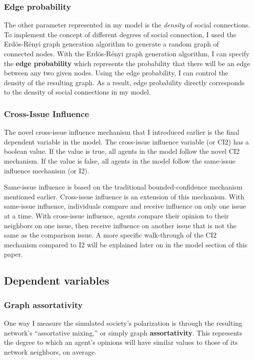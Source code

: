 \subsubsection{Edge probability}

The other parameter represented in my model is the \textit{density} of social
connections. To implement the concept of different degrees of social
connection, I used the Erd\"{o}s-R\'{e}nyi graph generation algorithm to
generate a random graph of connected nodes. With the Erd\"{o}s-R\'{e}nyi graph
generation algorithm, I can specify the \textbf{edge probability} which represents the
probability that there will be an edge between any two given nodes. Using the
edge probability, I can control the density of the resulting graph. As a
result, edge probability directly corresponds to the density of social
connections in my model.    

\subsubsection{Cross-Issue Influence}
The novel cross-issue influence mechanism that I introduced earlier is the final dependent variable in the model. The cross-issue influence variable (or CI2) has a boolean value. If the value is true, all agents in the model follow the novel CI2 mechanism. If the value is false, all agents in the model follow the same-issue influence mechanism (or I2).

Same-issue influence is based on the traditional bounded-confidence mechanism mentioned earlier. Cross-issue influence is an extension of this mechanism. With same-issue influence, individuals compare and receive influence on only one issue at a time. With cross-issue influence, agents compare their opinion to their neighbors on one issue, then receive influence on another issue that is not the same as the comparison issue. A more specific walk-through of the CI2 mechanism compared to I2 will be explained later on in the model section of this paper. 

\subsection{Dependent variables}

\subsubsection{Graph assortativity}

One way I measure the simulated society's polarization is through the
resulting network's ``assortative mixing,'' or simply graph
\textbf{assortativity}. This represents the degree to which an agent's opinions
will have similar values to those of its network neighbors, on average.

